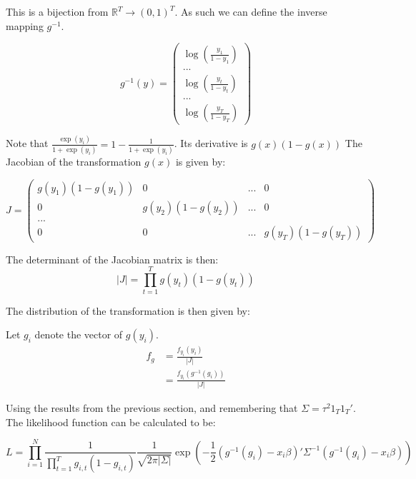\documentclass[12pt]{paper}
\newcommand{\abs}[1]{\left \lvert #1 \right \rvert}
\newcommand{\inv}[1]{{#1}^{-1}}
\newcommand{\setR}{ \mathbb{R} }
\begin{document}
This is a bijection from $\setR^T \rightarrow (0,1)^T$. As such we can define
the inverse mapping $\inv{g}$.

\begin{equation*}
  \inv{g}(y) =
  \begin{pmatrix}
    \log \left( \frac{y_1}{1-y_1} \right)\\
    ...\\
    \log \left( \frac{y_t}{1-y_t} \right)\\
    ...\\
    \log \left( \frac{y_T}{1-y_T} \right)
  \end{pmatrix}
\end{equation*}


Note that $\frac{\exp(y_i)}{1 + \exp(y_i)} = 1 -
\frac{1}{1+\exp(y_i)}$. Its derivative is $g(x)(1-g(x))$
The Jacobian of the transformation $g(x)$ is given by:

\begin{equation*}
  J =
  \begin{pmatrix}
    g(y_1)(1-g(y_1)) & 0 & ... & 0\\
    0 & g(y_2)(1-g(y_2)) & ... & 0 \\
    ... & & &\\
    0 & 0 & ... & g(y_T)(1-g(y_T))
  \end{pmatrix}
\end{equation*}

The determinant of the Jacobian matrix is then:
\begin{equation*}
  \abs{J} = \prod_{t=1}^T g(y_t)(1-g(y_t))
\end{equation*}

The distribution of the transformation is then given by:

Let $g_i$ denote the vector of $g(y_i)$.
\begin{align*}
  f_g &= \frac{f_{y_i}(y_i)}{\abs{J}}\\
  &= \frac{f_{y_i}(\inv{g}(g_i))}{\abs{J}}
\end{align*}

Using the results from the previous section, and remembering that
$\Sigma = \tau^2 1_T 1_T'$. The likelihood function can be calculated to be:

\begin{equation*}
  L = \prod_{i=1}^N \frac{1}{\prod_{t=1}^T g_{i,t}(1-g_{i,t})} \frac{1}{\sqrt{2 \pi \abs{\Sigma}}} \exp( - \frac{1}{2}
  (\inv{g}(g_i) - x_i \beta)' \inv{\Sigma} ( \inv{g}(g_i) - x_i \beta))
\end{equation*}
\end{document}
